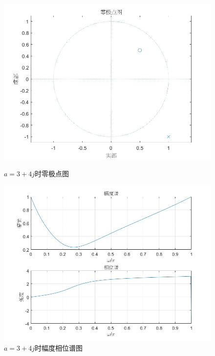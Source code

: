 \documentclass[a4paper,12pt]{article}
\begin{document}
\begin{figure}[h]
    \centering
    \begin{minipage}[b]{0.48\textwidth}
        \centering
        \includegraphics[width=\linewidth]{images/3_Verify/allpass2_1.jpg}
        \caption{$a=3 + 4j$时零极点图}
    \end{minipage}
    \hfill
    \begin{minipage}[b]{0.48\textwidth}
        \centering
        \includegraphics[width=\linewidth]{images/3_Verify/allpass2_2.jpg}
        \caption{$a=3 + 4j$时幅度相位谱图}
    \end{minipage}

\end{figure}
\end{document}
